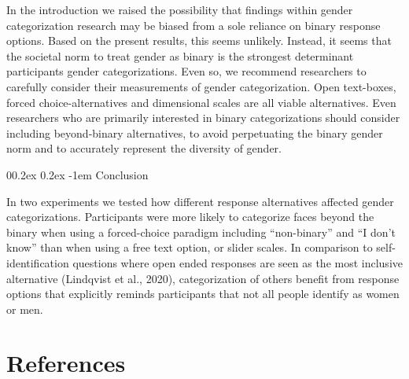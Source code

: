 \documentclass[
  man]{apa7}
\makeatletter
\let\oldparagraph\paragraph
\renewcommand{\paragraph}[1]{\oldparagraph{#1}\mbox{}}
\renewcommand{\paragraph}{\@startsection{paragraph}{4}{\parindent}%
  {0\baselineskip \@plus 0.2ex \@minus 0.2ex}%
  {-1em}%
  {\normalfont\normalsize\bfseries\itshape\typesectitle}}
\renewcommand{\paragraph}{\@startsection{paragraph}{4}{\parindent}%
  {0\baselineskip \@plus 0.2ex \@minus 0.2ex}%
  {-1em}%
  {\normalfont\normalsize\bfseries\typesectitle}}
\makeatother
\begin{document}
In the introduction we raised the possibility that findings within gender categorization research may be biased from a sole reliance on binary response options. Based on the present results, this seems unlikely. Instead, it seems that the societal norm to treat gender as binary is the strongest determinant participants gender categorizations. Even so, we recommend researchers to carefully consider their measurements of gender categorization. Open text-boxes, forced choice-alternatives and dimensional scales are all viable alternatives. Even researchers who are primarily interested in binary categorizations should consider including beyond-binary alternatives, to avoid perpetuating the binary gender norm and to accurately represent the diversity of gender.

\hypertarget{conclusion}{%
\paragraph{Conclusion}\label{conclusion}}

In two experiments we tested how different response alternatives affected gender categorizations. Participants were more likely to categorize faces beyond the binary when using a forced-choice paradigm including ``non-binary'' and ``I don't know'' than when using a free text option, or slider scales. In comparison to self-identification questions where open ended responses are seen as the most inclusive alternative (Lindqvist et al., 2020), categorization of others benefit from response options that explicitly reminds participants that not all people identify as women or men.

\newpage

\hypertarget{references}{%
\section{References}\label{references}}
\end{document}
